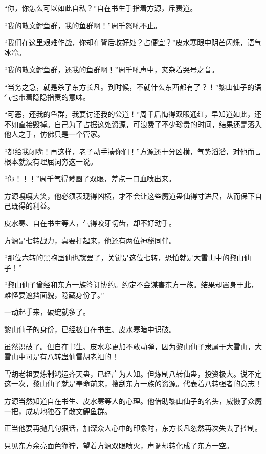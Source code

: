 
\begin{this_body}

“你，你怎么可以如此自私？”自在书生手指着方源，斥责道。

“我的散文鲤鱼群，我的鱼群啊！”周千怒吼不止。

“我们在这里艰难作战，你却在背后收好处？占便宜？”皮水寒眼中阴芒闪烁，语气冰冷。

“我的散文鲤鱼群，还我的鱼群啊！”周千吼声中，夹杂着哭号之音。

“当务之急，就是杀了东方长凡。到时候，不就什么东西都有了？！”黎山仙子的语气也带着隐隐指责的意味。

“可恶，还我的鱼群，我要讨还我的公道！”周千后悔得双眼通红，早知道如此，还不如直接毁掉。自己为了占据这处资源，可浪费了不少珍贵的时间，结果还是落入他人之手，仿佛只是一个管家。

“都给我闭嘴！再这样，老子动手揍你们！”方源还十分凶横，气势滔滔，对他而言根本就没有理屈词穷这一说。

“你！！！”周千气得瞪圆了双眼，差点一口血喷出来。

方源嘎嘎大笑，他必须表现得凶横，才不会让这些魔道蛊仙得寸进尺，从而保下自己既得的利益。

皮水寒、自在书生等人，气得咬牙切齿，却不好动手。

方源是七转战力，真要打起来，他还有两位神秘同伴。

“那位六转的黑袍蛊仙也就罢了，关键是这位七转，恐怕就是大雪山中的黎山仙子！”

“黎山仙子曾经和东方一族签订协约。约定不会谋害东方一族。结果却置身于此，难怪要遮挡面貌，隐藏身份了。”

一动起手来，破绽就多了。

黎山仙子的身份，已经被自在书生、皮水寒暗中识破。

虽然识破了。但自在书生、皮水寒更加不敢动弹，因为黎山仙子隶属于大雪山，大雪山中可是有八转蛊仙雪胡老祖的！

雪胡老祖要炼制鸿运齐天蛊，已经广为人知。但炼制八转仙蛊，投资极大。说不定这一次，黎山仙子就是奉命前来，搜刮东方一族的资源。代表着八转强者的意志！

方源当然知道自在书生、皮水寒等人的心理。他借助黎山仙子的名头，威慑了众魔一把，成功地独吞了散文鲤鱼群。

正当他要再抛几句狠话，加深众人心中的印象时，东方长凡忽然再次失去了控制。

只见东方余亮面色狰狞，望着方源双眼喷火，声调却转化成了东方一空。


\end{this_body}
